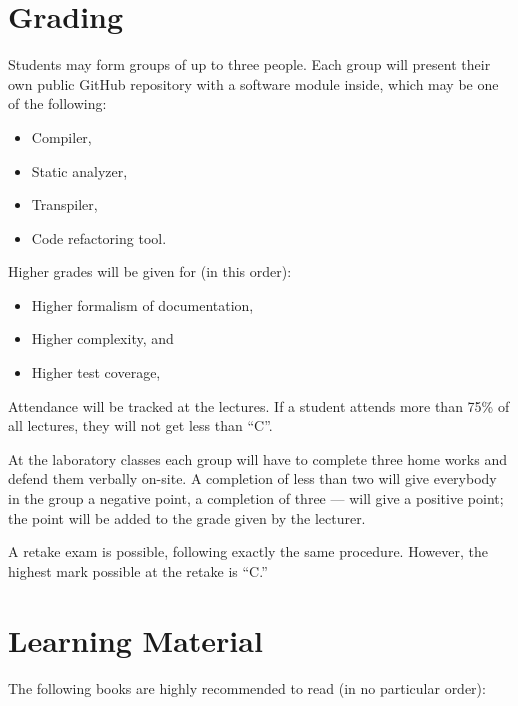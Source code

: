\documentclass[nobrand,anonymous,nodate,nosecurity]{huawei}
\begin{document}
\newpage
\section*{Grading}

Students may form groups of up to three people. Each group will present
their own public GitHub repository with a software module inside, which
may be one of the following:

\begin{itemize}
	\item Compiler,
	\item Static analyzer,
	\item Transpiler,
	\item Code refactoring tool.
\end{itemize}

Higher grades will be given for (in this order):

\begin{itemize}
	\item Higher formalism of documentation,
	\item Higher complexity,
	and
	\item Higher test coverage,
\end{itemize}

Attendance will be tracked at the lectures.
If a student attends more than 75\% of all lectures,
they will not get less than ``C''.

At the laboratory classes each group will have to complete three
home works and defend them verbally on-site.
A completion of less than two will give everybody in the group a negative point,
a completion of three --- will give a positive point; the point will be added
to the grade given by the lecturer.

A retake exam is possible, following exactly the same procedure.
However, the highest mark possible at the retake is ``C.''

\newpage
\section*{Learning Material}

The following books are highly recommended to read (in no particular order):
\end{document}
